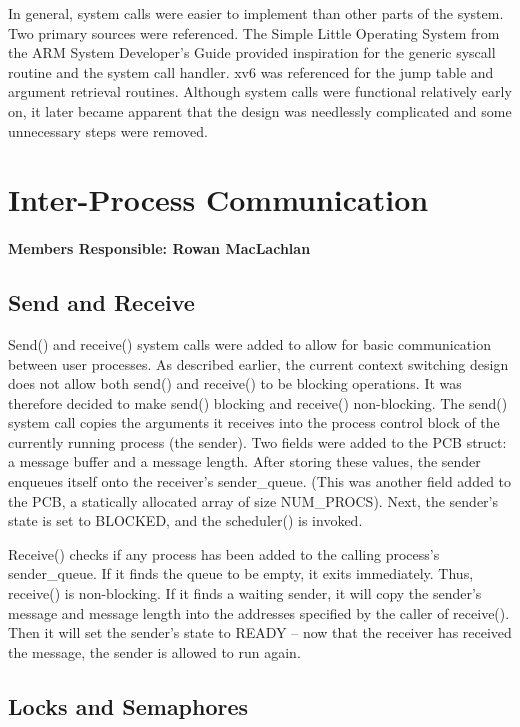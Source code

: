 \documentclass[12pt]{article}
\begin{document}
In general, system calls were easier to implement than other parts of the 
system. Two primary sources were referenced. The Simple Little Operating 
System from the ARM System Developer's Guide provided inspiration
for the generic syscall routine and the system call handler. xv6 was
referenced for the jump table and argument retrieval routines. Although 
system calls were functional relatively early on, it later became apparent
that the design was needlessly complicated and some unnecessary steps
were removed.

\section{Inter-Process Communication\label{ipc}}
\paragraph{Members Responsible: Rowan MacLachlan}

\subsection{Send and Receive}

Send() and receive() system calls were added to allow for basic communication
between user processes. As described earlier, the current context switching
design does not allow both send() and receive() to be blocking operations. It
was therefore decided to make send() blocking and receive() non-blocking. The
send() system call copies the arguments it receives into the process control block
of the currently running process (the sender). Two fields were added to the PCB
struct: a message buffer and a message length. After storing these values, the
sender enqueues itself onto the receiver's sender\_queue. (This was another field
added to the PCB, a statically allocated array of size NUM\_PROCS). Next, the
sender's state is set to BLOCKED, and the scheduler() is invoked.

Receive() checks if any process has been added to the calling process's
sender\_queue. If it finds the queue to be empty, it exits immediately. Thus,
receive() is non-blocking. If it finds a waiting sender, it will copy the
sender's message and message length into the addresses specified by the caller
of receive(). Then it will set the sender's state to READY -- now that the
receiver has received the message, the sender is allowed to run again.

\subsection{Locks and Semaphores}
\end{document}
